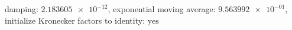 damping: $\num[scientific-notation=true]{2.183605e-12}$, exponential moving average: $\num[scientific-notation=true]{9.563992e-01}$, initialize Kronecker factors to identity: $\text{yes}$